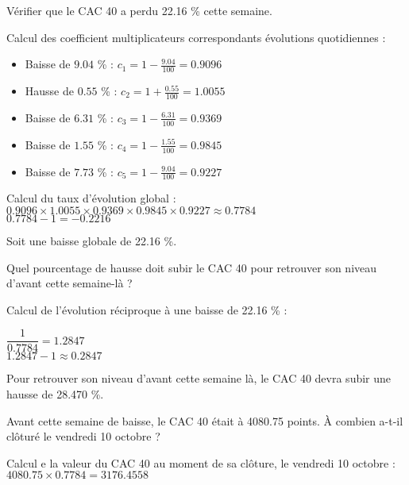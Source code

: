 \begin{questions}
	\question Vérifier que le CAC 40 a perdu \num{22.16} \% cette semaine.
		\begin{solution}
			Calcul des coefficient multiplicateurs correspondants évolutions quotidiennes :
			\begin{itemize}
				\item Baisse de $\num{9.04}$ \% : $c_1 = 1 - \frac{\num{9.04}}{100} = \num{0.9096 } $ 
				\item Hausse de $\num{0.55}$ \% : $c_2 = 1 + \frac{\num{0.55}}{100} = \num{1.0055 }$ 
				\item Baisse de $\num{6.31}$ \% : $c_3 = 1 - \frac{\num{6.31}}{100} = \num{0.9369 }$ 
				\item Baisse de $\num{1.55}$ \% : $c_4 = 1 - \frac{\num{1.55}}{100} = \num{0.9845 }$ 
				\item Baisse de $\num{7.73}$ \% : $c_5 = 1 - \frac{\num{9.04}}{100} = \num{0.9227 }$ 
			\end{itemize}
		
	
			Calcul du taux d'évolution global :
			$ \num{0.9096 } \times \num{1.0055 } \times \num{0.9369 } \times \num{0.9845 } \times \num{0.9227 } \approx \num{0.7784}$ \\
			
			$ \num{0.7784} - 1 = - \num{0.2216}$
			
			Soit une baisse globale de \num{22.16} \%.
		\end{solution}
	
	\question Quel pourcentage de hausse doit subir le CAC 40 pour retrouver son niveau d'avant cette semaine-là ?
		\begin{solution}
			Calcul de l'évolution réciproque à une baisse de \num{22.16} \% :
			
			$\dfrac{1}{\num{0.7784}} = \num{1.2847}$\\
			
			$ \num{1.2847} - 1 \approx \num{0.2847}$
			
			Pour retrouver son niveau d'avant cette semaine là, le CAC 40 devra subir une hausse de \num{28.470} \%.
		\end{solution}
	
	\question Avant cette semaine de baisse, le CAC 40 était à \num{4080.75} points. \`A combien a-t-il clôturé le vendredi 10 octobre ?
		\begin{solution}
			
			Calcul e la valeur du CAC 40 au moment de sa clôture, le vendredi 10 octobre : 
			$\num{4080.75} \times \num{0.7784} = \num{3176.4558}$
			

\end{solution}
\end{questions}
